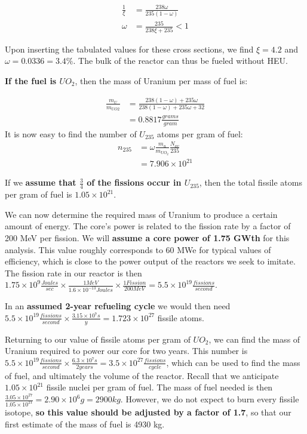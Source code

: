 \documentclass[12pt]{article}
\begin{document}
\begin{align}
\frac{1}{\xi} &= \frac{238 \omega}{235 (1 - \omega)} \\
\omega &= \frac{235}{238 \xi + 235} < 1
\end{align} 

Upon inserting the tabulated values for these cross sections, we find $\xi = 4.2$ and $\omega = 0.0336 = 3.4 \% $. The bulk of the reactor can thus be fueled without HEU.

\textbf{If the fuel is $UO_2$}, then the mass of Uranium per mass of fuel is:

\begin{align}
\frac{m_U}{m_{UO2}} &= \frac{238 (1 - \omega) + 235 \omega}{238 (1 - \omega) + 235 \omega + 32} \\
 &= 0.8817 \frac{grams}{gram}
\end{align}
It is now easy to find the number of $U_{235}$ atoms per gram of fuel:
\begin{align}
n_{235} &= \omega \frac{m_u}{m_{UO_2}} \frac{N_{av}}{235} \\
 &= 7.906 \times 10^{21}
\end{align}

If we \textbf{assume that $\frac{3}{4}$ of the fissions occur in $U_{235}$}, then the total fissile atoms per gram of fuel is $1.05 \times 10^{21}$. 

We can now determine the required mass of Uranium to produce a certain amount of energy. The core's power is related to the fission rate by a factor of 200 MeV per fission. We will \textbf{assume a core power of 1.75 GWth} for this analysis. This value roughly corresponds to 60 MWe for typical values of efficiency, which is close to the power output of the reactors we seek to imitate. The fission rate in our reactor is then $1.75 \times 10^9 \frac{Joules}{sec} \times \frac{1 MeV}{1.6 \times 10^{-13} Joules} \times \frac{1 Fission}{200 MeV} = 5.5 \times 10^{19} \frac{fissions}{second}$.

In an \textbf{assumed 2-year refueling cycle} we would then need $5.5 \times 10^{19} \frac{fissions}{second} \times \frac{3.15 \times 10^7 s}{y} = 1.723 \times 10^{27}$ fissile atoms. 

Returning to our value of fissile atoms per gram of $UO_2$, we can find the mass of Uranium required to power our core for two years. This number is $5.5 \times 10^{19} \frac{fissions}{second} \times \frac{6.3 \times 10^7 s}{2 years} = 3.5 \times 10^{27} \frac{fissions}{cycle}$, which can be used to find the mass of fuel, and ultimately the volume of the reactor. Recall that we anticipate $1.05 \times 10^{21}$ fissile nuclei per gram of fuel. The mass of fuel needed is then $\frac{3.05 \times 10 ^{27}}{1.05 \times 10^{21}} = 2.90 \times 10^{6} g = 2900 kg$. However, we do not expect to burn every fissile isotope, \textbf{so this value should be adjusted by a factor of 1.7}, so that our first estimate of the mass of fuel is 4930 kg. 
\end{document}

